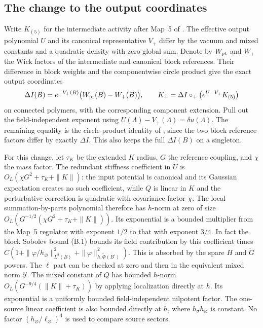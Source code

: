\documentclass[11pt]{article}
\begin{document}
\subsection{The change to the output coordinates}
Write \(K_{(5)}\) for the intermediate activity after Map~5
of \cite{ParkMap}. The effective output polynomial \(U\) and its
canonical representative \(V_+\) differ by the vacuum and mixed
constants and a quadratic density with zero global sum. Denote
by \(W_{\rm pt}\) and \(W_+\) the Wick factors of the intermediate
and canonical block references. Their difference in block weights
and the componentwise circle product give the exact output
coordinates
\[
 \Delta I(B)=e^{-V_+(B)}\bigl(W_{\rm pt}(B)-W_+(B)\bigr),\qquad
 K_+=\Delta I\circ_+\bigl(e^{U-V_+}K_{(5)}\bigr)
\]
on connected polymers, with the corresponding component
extension. Pull out the field-independent exponent using
\(U(\Lambda)-V_+(\Lambda)=\delta u(\Lambda)\).
The remaining equality is the circle-product identity of \cite[Lemma E.1]{ParkMap},
since the two block reference factors differ by exactly
\(\Delta I\). This also keeps the full \(\Delta I(B)\) on a singleton.

For this change, let \(\tau_K\) be the extended \(K\) radius,
\(G\) the reference coupling, and \(\chi\) the mass factor.
The redundant stiffness coefficient in \(U\) is
\(O_L(\chi G^2+\tau_K+\|K\|)\): the input potential is
canonical and its Gaussian expectation creates no such
coefficient, while \(Q\) is linear in \(K\) and the
perturbative correction is quadratic with covariance
factor \(\chi\). The local summation-by-parts polynomial
therefore has \(h\)-norm at zero of size
\(O_L(G^{-1/2}(\chi G^2+\tau_K+\|K\|))\).
Its exponential is a bounded multiplier from the
Map~5 regulator with exponent \(1/2\) to that with exponent
\(3/4\). In fact the block Sobolev bound (B.1) bounds
its field contribution by this coefficient times
\(C(1+\| \varphi/h_\varnothing\|_{L^2(B)}^2+
\|\varphi\|_{h,\widetilde\Phi(B^\square)}^2)\).
This is absorbed by the spare \(H\) and \(\widetilde G\)
powers. The \(\ell\) part can be checked at zero and
then in the equivalent mixed norm \(\mathcal Y\).
The mixed constant of \(Q\) has bounded \(h\)-norm
\(O_L(G^{-9/4}(\|K\|+\tau_K))\) by applying localization
directly at \(h\). Its exponential is a uniformly
bounded field-independent nilpotent factor.
The one-source linear coefficient is also bounded directly
at \(h\), where \(h_\sigma h_\varnothing\) is constant.
No factor \((h_\varnothing/\ell_\varnothing)^4\) is
used to compare source sectors.
\end{document}
